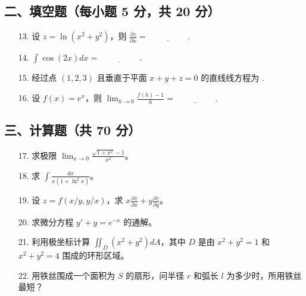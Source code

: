\documentclass[11pt,a4paper]{article}
\begin{document}
\subsection*{二、填空题（每小题 5 分，共 20 分）}
\begin{enumerate}
    \item[13.] 设 $z = \ln(x^2+y^2)$，则 $\frac{\partial z}{\partial x} = \underline{\hspace{2cm}}$.
    \item[14.] $\int \cos(2x) dx = \underline{\hspace{2cm}}$.
    \item[15.] 经过点 $(1,2,3)$ 且垂直于平面 $x+y+z=0$ 的直线线方程为 \underline{\hspace{2cm}}.
    \item[16.] 设 $f(x) = e^x$，则 $\lim_{h \to 0} \frac{f(h)-1}{h} = \underline{\hspace{2cm}}$.
\end{enumerate}
\subsection*{三、计算题（共 70 分）}
\begin{enumerate}
    \item[17.] 求极限 $\lim_{x \to 0} \frac{\sqrt{1+x^2} - 1}{x^2}$。
    \item[18.] 求 $\int \frac{dx}{x(1+\ln^2 x)}$。
    \item[19.] 设 $z = f(x/y, y/x)$，求 $x \frac{\partial z}{\partial x} + y \frac{\partial z}{\partial y}$。
    \item[20.] 求微分方程 $y' + y = e^{-x}$ 的通解。
    \item[21.] 利用极坐标计算 $\iint_D (x^2+y^2) dA$，其中 $D$ 是由 $x^2+y^2=1$ 和 $x^2+y^2=4$ 围成的环形区域。
    \item[22.] 用铁丝围成一个面积为 $S$ 的扇形，问半径 $r$ 和弧长 $l$ 为多少时，所用铁丝最短？
\end{enumerate}
\end{document}
